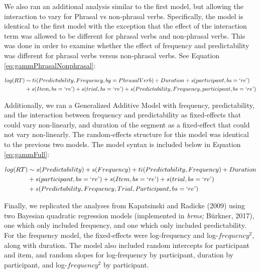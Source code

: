 \documentclass[
  man,floatsintext]{apa6}
\begin{document}
We also ran an additional analysis similar to the first model, but allowing the interaction to vary for Phrasal vs non-phrasal verbs. Specifically, the model is identical to the first model with the exception that the effect of the interaction term was allowed to be different for phrasal verbs and non-phrasal verbs. This was done in order to examine whether the effect of frequency and predictability was different for phrasal verbs versus non-phrasal verbs. See Equation \eqref{eq:gammPhrasalNonphrasal}:

\begin{equation}
\begin{aligned}
\label{eq:gammPhrasalNonphrasal}
log(RT) & \sim ti(Predictability, Frequency, by = PhrasalVerb) + Duration + s(participant, bs = `re\text{'}) \\ 
& + s(Item, bs = `re\text{'}) + s(trial, bs = `re\text{'}) + s(Predictability, Frequency, participant, bs = `re\text{'}) 
\end{aligned}
\end{equation}

Additionally, we ran a Generalized Additive Model with frequency, predictability, and the interaction between frequency and predictability as fixed-effects that could vary non-linearly, and duration of the segment as a fixed-effect that could not vary non-linearly. The random-effects structure for this model was identical to the previous two models. The model syntax is included below in Equation \eqref{eq:gammFull}:

\begin{equation}
\begin{aligned}
\label{eq:gammFull}
log(RT) & \sim s(Predictability) + s(Frequency) + ti (Predictability, Frequency) + Duration \\ & + s(participant, bs = `re\text{'}) + s(Item, bs = `re\text{'})  
+ s(trial, bs = `re\text{'}) \\ & + s(Predictability, Frequency, Trial, Participant, bs = `re\text{'}) 
\end{aligned}
\end{equation}

Finally, we replicated the analyses from Kapatsinski and Radicke (2009) using two Bayesian quadratic regression models (implemented in \emph{brms;} Bürkner, 2017), one which only included frequency, and one which only included predictability. For the frequency model, the fixed-effects were log-frequency and log-\(frequency^2\), along with duration. The model also included random intercepts for participant and item, and random slopes for log-frequency by participant, duration by participant, and log-\(frequency^2\) by participant.
\end{document}
